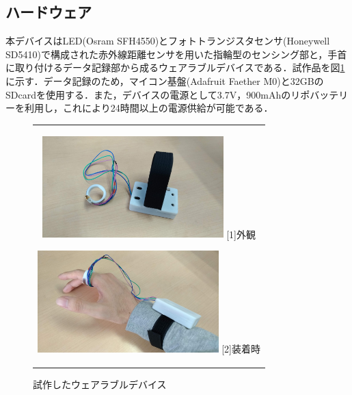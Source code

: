 \documentclass[11pt,a4paper]{jarticle}
\begin{document}
\subsection{ハードウェア}
本デバイスはLED(Osram SFH4550)とフォトトランジスタセンサ(Honeywell SD5410)で構成された赤外線距離センサを用いた指輪型のセンシング部と，手首に取り付けるデータ記録部から成るウェアラブルデバイスである．試作品を図\ref{fig:device}に示す．データ記録のため，マイコン基盤(Adafruit Faether M0)と32GBのSDcardを使用する．また，デバイスの電源として3.7V，900mAhのリポバッテリーを利用し，これにより24時間以上の電源供給が可能である．
\begin{figure}[H]
  \begin{center}
    \begin{tabular}{c}

      \begin{minipage}{0.5\hsize}
        \begin{center}
          \includegraphics[clip, width=7cm]{fig/fal1.jpg}
          \hspace{3.2cm} [1]外観
        \end{center}
      \end{minipage}

      \begin{minipage}{0.5\hsize}
        \begin{center}
          \includegraphics[clip, width=7cm]{fig/fal2.jpg}
          \hspace{3.2cm} [2]装着時
        \end{center}
      \end{minipage}

    \end{tabular}
    \caption{試作したウェアラブルデバイス}
    \label{fig:device}
  \end{center}
\end{figure}
\end{document}
